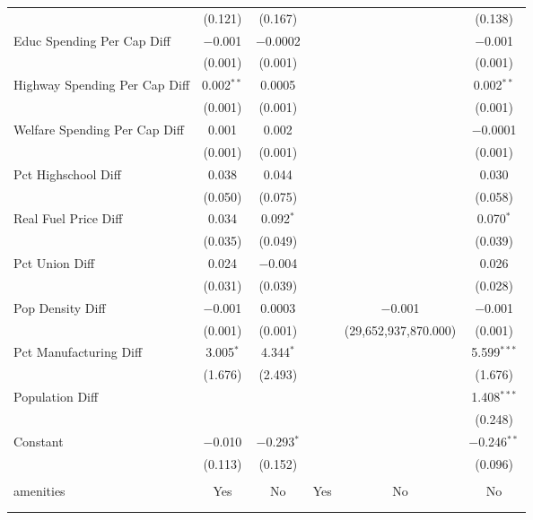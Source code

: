 \begin{table}[!htbp]
\begin{tabular}{@{\extracolsep{5pt}}lccccc}
  & (0.121) & (0.167) &  &  & (0.138) \\ 
  Educ Spending Per Cap Diff & $-$0.001 & $-$0.0002 &  &  & $-$0.001 \\ 
  & (0.001) & (0.001) &  &  & (0.001) \\ 
  Highway Spending Per Cap Diff & 0.002$^{**}$ & 0.0005 &  &  & 0.002$^{**}$ \\ 
  & (0.001) & (0.001) &  &  & (0.001) \\ 
  Welfare Spending Per Cap Diff & 0.001 & 0.002 &  &  & $-$0.0001 \\ 
  & (0.001) & (0.001) &  &  & (0.001) \\ 
  Pct Highschool Diff & 0.038 & 0.044 &  &  & 0.030 \\ 
  & (0.050) & (0.075) &  &  & (0.058) \\ 
  Real Fuel Price Diff & 0.034 & 0.092$^{*}$ &  &  & 0.070$^{*}$ \\ 
  & (0.035) & (0.049) &  &  & (0.039) \\ 
  Pct Union Diff & 0.024 & $-$0.004 &  &  & 0.026 \\ 
  & (0.031) & (0.039) &  &  & (0.028) \\ 
  Pop Density Diff & $-$0.001 & 0.0003 &  & $-$0.001 & $-$0.001 \\ 
  & (0.001) & (0.001) &  & (29,652,937,870.000) & (0.001) \\ 
  Pct Manufacturing Diff & 3.005$^{*}$ & 4.344$^{*}$ &  &  & 5.599$^{***}$ \\ 
  & (1.676) & (2.493) &  &  & (1.676) \\ 
  Population Diff &  &  &  &  & 1.408$^{***}$ \\ 
  &  &  &  &  & (0.248) \\ 
  Constant & $-$0.010 & $-$0.293$^{*}$ &  &  & $-$0.246$^{**}$ \\ 
  & (0.113) & (0.152) &  &  & (0.096) \\ 
 \hline \\[-1.8ex] 
amenities & Yes & No & Yes & No & No \\ 
\hline \\[-1.8ex] 
\hline 
\hline \\[-1.8ex] 
\end{tabular} 
\end{table} 
